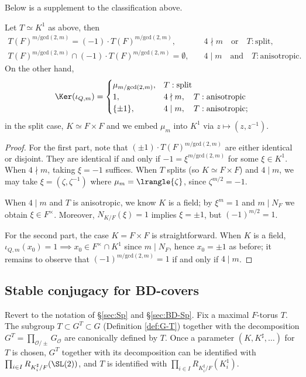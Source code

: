\documentclass[a4paper,10pt]{article}
\begin{document}
Below is a supplement to the classification above.
\begin{proposition}\label{prop:iota-kernel}
	Let $T \simeq K^1$ as above, then
	\begin{align*}
		T(F)^{m/\mathrm{gcd}(2,m)} = (-1) \cdot T(F)^{m/\mathrm{gcd}(2,m)}, & \quad  4 \nmid m \quad \text{or}\quad T: \text{split}, \\
		T(F)^{m/\mathrm{gcd}(2,m)} \cap (-1) \cdot T(F)^{m/\mathrm{gcd}(2,m)} = \emptyset, & \quad 4 \mid m \quad\text{and}\quad T: \text{anisotropic}.
	\end{align*}
	On the other hand,
	\begin{equation}
		\Ker(\iota_{Q,m}) = \begin{cases}
			\mu_{m/\mathrm{gcd}(2,m)}, & T: \text{split} \\
			1, & 4 \nmid m, \quad T: \text{anisotropic} \\
			\{\pm 1 \}, & 4 \mid m, \quad T: \text{anisotropic};
	\end{cases}\end{equation}
	in the split case, $K \simeq F \times F$ and we embed $\mu_m$ into $K^1$ via $z \mapsto (z, z^{-1})$.
\end{proposition}
\begin{proof}
	For the first part, note that $(\pm 1) \cdot T(F)^{m/\text{gcd}(2,m)}$ are either identical or disjoint. They are identical if and only if $-1 = \xi^{m/\text{gcd}(2,m)}$ for some $\xi \in K^1$. When $4 \nmid m$, taking $\xi = -1$ suffices. When $T$ splits (so $K \simeq F \times F$) and $4 \mid m$, we may take $\xi = (\zeta, \zeta^{-1})$ where $\mu_m = \lrangle{\zeta}$, since $\zeta^{m/2} = -1$.

	When $4 \mid m$ and $T$ is anisotropic, we know $K$ is a field; by $\xi^m = 1$ and $m \mid N_F$ we obtain $\xi \in F^\times$. Moreover, $N_{K/F}(\xi)=1$ implies $\xi = \pm 1$, but $(-1)^{m/2} = 1$.

	For the second part, the case $K = F \times F$ is straightforward. When $K$ is a field, $\iota_{Q,m}(x_0) = 1 \implies x_0 \in F^\times \cap K^1$ since $m \mid N_F$, hence $x_0 = \pm 1$ as before; it remains to observe that $(-1)^{m/\text{gcd}(2,m)} = 1$ if and only if $4 \mid m$.
\end{proof}

\subsection{Stable conjugacy for BD-covers}\label{sec:st-conj-BD}
Revert to the notation of \S\ref{sec:Sp} and \S\ref{sec:BD-Sp}. Fix a maximal $F$-torus $T$. The subgroup $T \subset G^T \subset G$ (Definition \ref{def:G-T}) together with the decomposition $G^T = \prod_{\mathcal{O}/\pm} G_{\mathcal{O}}$ are canonically defined by $T$. Once a parameter $(K, K^\sharp, \ldots)$ for $T$ is chosen, $G^T$ together with its decomposition can be identified with $\prod_{i \in I} R_{K_i^\sharp/F}(\SL(2))$, and $T$ is identified with $\prod_{i \in I} R_{K_i^\sharp/F}(K_i^1)$.
\end{document}
